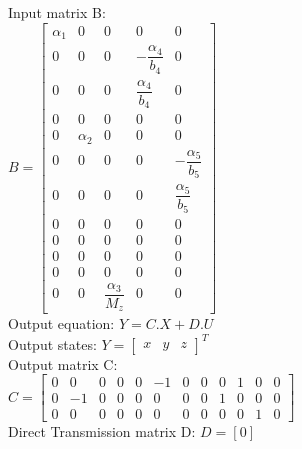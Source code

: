 \documentclass[14pt,a4paper]{article}
\begin{document}
	\pagebreak
	Input matrix B: \\
	\hspace*{3cm} $ B = \begin{bmatrix} \alpha_1 & 0&0&0&0 \\ 0&0&0& -\dfrac{\alpha_4}{b_4} & 0 \\ 0&0&0&  \dfrac{\alpha_4}{b_4} & 0 \\ 0&0&0&0&0 \\ 0& \alpha_2 &0&0&0 \\ 0&0&0&0& -\dfrac{\alpha_5}{b_5} \\ 0&0&0&0 & \dfrac{\alpha_5}{b_5} \\ 0&0&0&0&0 \\ 0&0&0&0&0 \\ 0&0&0&0&0 \\ 0&0&0&0&0 \\ 0&0& \dfrac{\alpha_3}{M_z} &0&0 \end{bmatrix}$ \\
	
	
	Output equation: $ Y = C.X + D.U $\\
	Output states: $Y = {\begin{bmatrix}  x&y&z \end{bmatrix}}^T $ \\
	Output matrix C: \\
	\hspace*{2.5cm}$ C = \begin{bmatrix} 0&0&0&0&0& -1 &0&0&0& 1& 0& 0 \\ 0& -1 &0&0&0&0&0&0& 1 &0&0&0 \\ 0&0&0&0&0&0&0&0&0&0&1&0 \end{bmatrix} $ \\
	
	Direct Transmission matrix D: $D = [0]$ \\
	
	
	
\pagebreak
\end{document}

